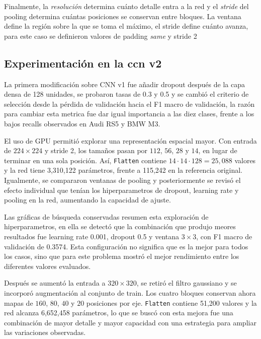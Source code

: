 \documentclass[conference]{IEEEtran}
\begin{document}
Finalmente, la \textit{resolución} determina cuánto detalle entra a la red y el \textit{stride} del pooling determina cuántas posiciones se conservan entre bloques. La ventana define la región sobre la que se toma el máximo, el stride define cuánto avanza, para este caso se definieron valores de padding \textit{same} y stride 2

\subsection{Experimentación en la ccn v2}

La primera modificación sobre CNN v1 fue añadir dropout después de la capa densa de 128 unidades, se probaron tasas de 0.3 y 0.5 y se cambió el criterio de selección desde la pérdida de validación hacia el F1 macro de validación, la razón para cambiar esta metrica fue dar igual importancia a las diez clases, frente a los bajos recalls observados en Audi RS5 y BMW M3. 

El uso de GPU permitió explorar una representación espacial mayor. Con entrada de $224\times224$ y stride 2, los tamaños pasan por $112$, $56$, $28$ y $14$, en lugar de terminar en una sola posición. Así, \texttt{Flatten} contiene $14\cdot14\cdot128=25{,}088$ valores y la red tiene 3,310,122 parámetros, frente a 115,242 en la referencia original. Igualmente, se compararon ventanas de pooling y posteriormente se revisó el efecto individual que tenían los  hiperparametros de dropout, learning rate y pooling en la red, aumentando la capacidad de ajuste.

Las gráficas de búsqueda conservadas resumen esta exploración de hiperparametros, en ella se detectó que la combinación que produjo meores resultados fue learning rate 0.001, dropout 0.5 y ventana $3\times3$, con F1 macro de validación de 0.3574. Esta configuración no significa que es la mejor para todos los casos, sino que para este problema mostró el mejor rendimiento entre los diferentes valores evaluados. 

Después se aumentó la entrada a $320\times320$, se retiró el filtro gaussiano y se incorporó augmentación al conjunto de train. Los cuatro bloques conservan ahora mapas de $160$, $80$, $40$ y $20$ posiciones por eje. \texttt{Flatten} contiene 51,200 valores y la red alcanza 6,652,458 parámetros, lo que se buscó con esta mejora fue una combinación de mayor detalle y mayor capacidad con una estrategia para ampliar las variaciones observadas.
\end{document}
